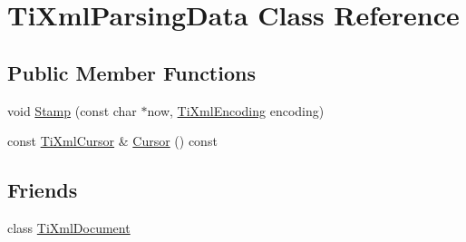\hypertarget{class_ti_xml_parsing_data}{\section{Ti\-Xml\-Parsing\-Data Class Reference}
\label{class_ti_xml_parsing_data}
}
\subsection*{Public Member Functions}
\begin{DoxyCompactItemize}
\item 
void \hyperlink{class_ti_xml_parsing_data_a65cee8ab77a36c605db08c84b4c30a7d}{Stamp} (const char $\ast$now, \hyperlink{tinyxml_8h_a88d51847a13ee0f4b4d320d03d2c4d96}{Ti\-Xml\-Encoding} encoding)
\item 
const \hyperlink{struct_ti_xml_cursor}{Ti\-Xml\-Cursor} \& \hyperlink{class_ti_xml_parsing_data_a9e63d965fdb53ff4ac711e105269e918}{Cursor} () const 
\end{DoxyCompactItemize}
\subsection*{Friends}
\begin{DoxyCompactItemize}
\item 
class \hyperlink{class_ti_xml_parsing_data_a173617f6dfe902cf484ce5552b950475}{Ti\-Xml\-Document}
\end{DoxyCompactItemize}


